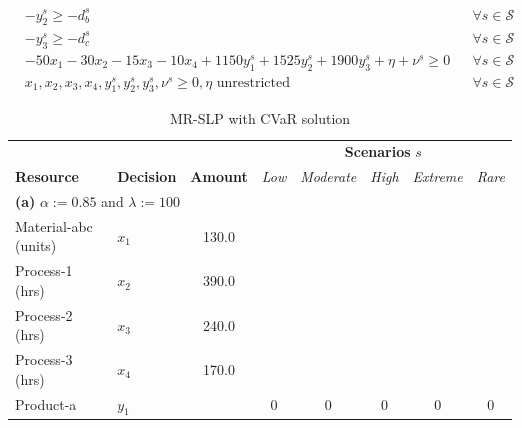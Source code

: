 \documentclass[7pt]{article}
\begin{document}
\begin{align*}
     & -y_2^s \geq -d_b^s                                                                             &  & \forall s \in \mathcal{S} \\
     & -y_3^s \geq -d_c^s                                                                             &  & \forall s \in \mathcal{S} \\
     & - 50 x_1 - 30 x_2 - 15 x_3 - 10 x_4 + 1150y_1^s + 1525y_2^s + 1900 y_3^s + \eta + \nu^s \geq 0 &  & \forall s \in \mathcal{S} \\
     & x_1, x_2, x_3, x_4, y_1^s, y_2^s, y_3^s, \nu^s \geq 0, \eta \text{ unrestricted}               &  & \forall s \in \mathcal{S}
\end{align*}

\begin{table}[h!]
    \centering
    \footnotesize
    \caption{\small{MR-SLP with CVaR solution}}
    \begin{tabular}{ll|c|ccccc}
        \toprule
        \multicolumn{3}{l|}{} & \multicolumn{5}{c}{\textbf{Scenarios }$s$}                                                                                                         \\
        \textbf{Resource}     & \textbf{Decision}                          & \textbf{Amount} & \textit{Low} & \textit{Moderate} & \textit{High} & \textit{Extreme} & \textit{Rare} \\
        \midrule
        \multicolumn{8}{l}{\textbf{(a)} $\alpha := 0.85$ and $\lambda := 100$}                                                                                                     \\
        \midrule
        Material-abc (units)  & $x_1$                                      & 130.0           &              &                   &               &                                  \\
        Process-1 (hrs)       & $x_2$                                      & 390.0           &              &                   &               &                                  \\
        Process-2 (hrs)       & $x_3$                                      & 240.0           &              &                   &               &                                  \\
        Process-3 (hrs)       & $x_4$                                      & 170.0           &              &                   &               &                                  \\
        Product-a             & $y_1$                                      &                 & 0            & 0                 & 0             & 0                & 0             \\

\end{tabular}
\end{table}
\end{document}
